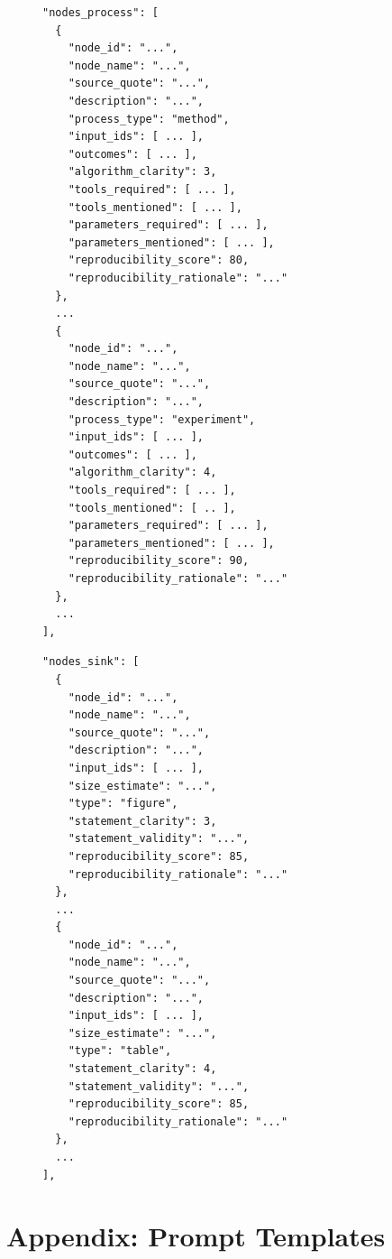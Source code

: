 \documentclass{article}
\begin{document}
\begin{figure}[!ht]
\noindent
\begin{minipage}[t]{0.49\textwidth}
\begin{lstlisting}[basicstyle=\ttfamily\small, frame=single]
"nodes_process": [
  {
    "node_id": "...",
    "node_name": "...",
    "source_quote": "...",
    "description": "...",
    "process_type": "method",
    "input_ids": [ ... ],
    "outcomes": [ ... ],
    "algorithm_clarity": 3,
    "tools_required": [ ... ],
    "tools_mentioned": [ ... ],
    "parameters_required": [ ... ],
    "parameters_mentioned": [ ... ],
    "reproducibility_score": 80,
    "reproducibility_rationale": "..."
  },
  ...
  {
    "node_id": "...",
    "node_name": "...",
    "source_quote": "...",
    "description": "...",
    "process_type": "experiment",
    "input_ids": [ ... ],
    "outcomes": [ ... ],
    "algorithm_clarity": 4,
    "tools_required": [ ... ],
    "tools_mentioned": [ .. ],
    "parameters_required": [ ... ],
    "parameters_mentioned": [ ... ],
    "reproducibility_score": 90,
    "reproducibility_rationale": "..."
  },
  ...
],
\end{lstlisting}
\end{minipage}\hfill
\begin{minipage}[t]{0.49\textwidth}
\begin{lstlisting}[basicstyle=\ttfamily\small, frame=single]
"nodes_sink": [
  {
    "node_id": "...",
    "node_name": "...",
    "source_quote": "...",
    "description": "...",
    "input_ids": [ ... ],
    "size_estimate": "...",
    "type": "figure",
    "statement_clarity": 3,
    "statement_validity": "...",
    "reproducibility_score": 85,
    "reproducibility_rationale": "..."
  },
  ...
  {
    "node_id": "...",
    "node_name": "...",
    "source_quote": "...",
    "description": "...",
    "input_ids": [ ... ],
    "size_estimate": "...",
    "type": "table",
    "statement_clarity": 4,
    "statement_validity": "...",
    "reproducibility_score": 85,
    "reproducibility_rationale": "..."
  },
  ...
],
\end{lstlisting}
\end{minipage}
\end{figure}




\clearpage
\section{Appendix: Prompt Templates} \label{appendix:prompts}
\end{document}
